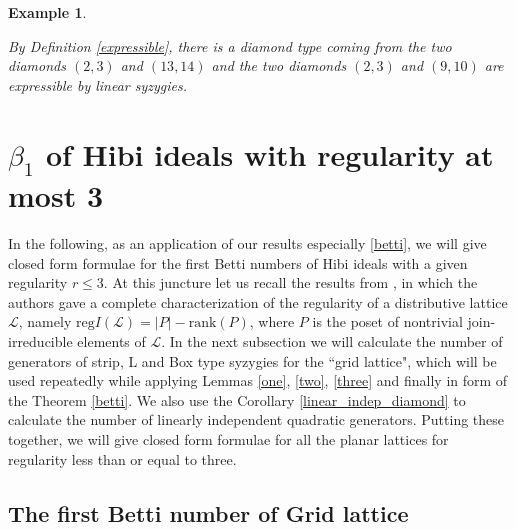 \documentclass[10pt,reqno]{amsart}
\numberwithin{equation}{section}
\newtheorem{example}[theorem]{Example}
\begin{document}
\begin{example}
\begin{figure}[H]
\label{figure}
\caption{}
\end{figure}
 By Definition \ref{expressible}, there is a diamond type coming from the two diamonds $(2,3)$ and $(13,14)$ and the two diamonds $(2,3)$ and $(9,10)$ are expressible by linear syzygies.
\end{example}

\section{$\beta_1$ of Hibi ideals with regularity at most 3}

In the following, as an application of our results especially \ref{betti}, we will give closed form formulae for the first Betti numbers of Hibi ideals with a given regularity $r\leq 3$. At this juncture let us recall the results from \cite{herzog}, in which the authors gave a complete characterization of the regularity of a distributive lattice $\mathcal{L}$, namely $\mbox{reg} I(\mathcal{L})= |P| - \mbox{rank} (P)$, where $P$ is the poset of nontrivial join-irreducible elements of $\mathcal{L}$. In the next subsection we will calculate the number of generators of strip, L and Box type syzygies for the ``grid lattice", which will be used repeatedly while applying Lemmas \ref{one}, \ref{two}, \ref{three} and finally in form of the Theorem \ref{betti}. We also use the Corollary \ref{linear_indep_diamond} to calculate the number of linearly independent quadratic generators. Putting these together, we will give closed form formulae for all the planar lattices for regularity less than or equal to three.
\subsection{The first Betti number of Grid lattice}\label{grid_betti}
\end{document}
